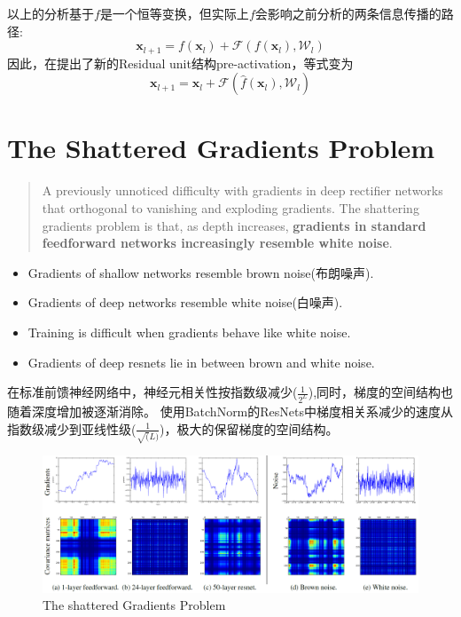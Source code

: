以上的分析基于$f$是一个恒等变换，但实际上$f$会影响之前分析的两条信息传播的路径:
\begin{equation}
    \mathbf{x}_{l+1} = f(\mathbf{x}_l) + \mathcal{F}(f(\mathbf{x}_l), \mathcal{W}_l)
\end{equation}
因此，在\cite{He2016identity}提出了新的Residual unit结构pre-activation，等式变为
\begin{equation}
    \mathbf{x}_{l+1} = \mathbf{x}_l + \mathcal{F}(\hat f(\mathbf{x}_l), \mathcal{W}_l)
\end{equation}

\section{The Shattered Gradients Problem}
\begin{quotation}
    A previously unnoticed difficulty with gradients in deep rectifier networks that orthogonal
    to vanishing and exploding gradients. The shattering gradients problem is that, as depth increases,
    \textbf{gradients in standard feedforward networks increasingly resemble white noise}\cite{Balduzzi2017}.
\end{quotation}
\begin{itemize}
    \item Gradients of shallow networks resemble brown noise(布朗噪声).
    \item Gradients of deep networks resemble white noise(白噪声).
    \item Training is difficult when gradients behave like white noise.
    \item Gradients of deep resnets lie in between brown and white noise.
\end{itemize}

在标准前馈神经网络中，神经元相关性按指数级减少($\frac{1}{2^L}$),同时，梯度的空间结构也随着深度增加被逐渐消除。
使用BatchNorm的ResNets中梯度相关系减少的速度从指数级减少到亚线性级($\frac{1}{\sqrt(L)}$)，极大的保留梯度的空间结构。

\begin{figure}[H]
    \centering
    \includegraphics[width=14cm]{images/brown_white_noise.png}
    \caption{The shattered Gradients Problem}
    \label{fig:brown_white_noise}
\end{figure}


